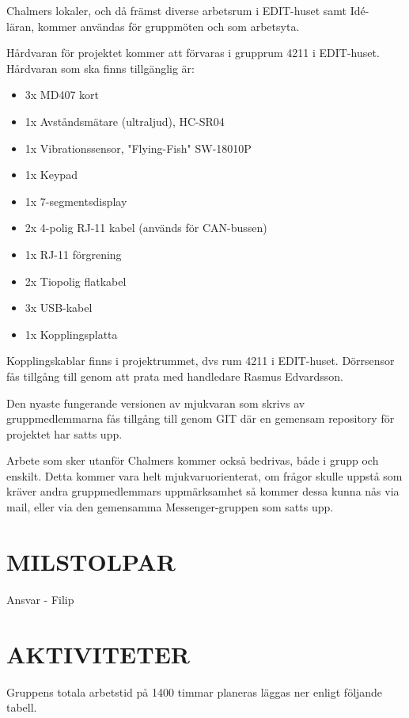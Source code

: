 \documentclass[a4paper]{article}
\begin{document}
Chalmers lokaler, och då främst diverse arbetsrum i EDIT-huset samt Idé-\\läran, kommer användas för gruppmöten och som arbetsyta.

Hårdvaran för projektet kommer att förvaras i grupprum 4211 i EDIT-huset. Hårdvaran som ska finns tillgänglig är:
\begin{itemize}
    \item 3x MD407 kort 
    \item 1x Avståndsmätare (ultraljud), HC-SR04 
    \item 1x Vibrationssensor, "Flying-Fish" SW-18010P 
    \item 1x Keypad 
    \item 1x 7-segmentsdisplay 
    \item 2x 4-polig RJ-11 kabel (används för CAN-bussen) 
    \item 1x RJ-11 förgrening
    \item 2x Tiopolig flatkabel 
    \item 3x USB-kabel 
    \item 1x Kopplingsplatta
\end{itemize}

Kopplingskablar finns i projektrummet, dvs rum 4211 i EDIT-huset. Dörrsensor fås tillgång till genom att prata med handledare Rasmus Edvardsson.

Den nyaste fungerande versionen av mjukvaran som skrivs av gruppmedlemmarna fås tillgång till genom GIT där en gemensam repository för projektet har satts upp.

Arbete som sker utanför Chalmers kommer också bedrivas, både i grupp och enskilt. Detta kommer vara helt mjukvaruorienterat, om frågor skulle uppstå som kräver andra gruppmedlemmars uppmärksamhet så kommer dessa kunna nås via mail, eller via den gemensamma Messenger-gruppen som satts upp.

\section{MILSTOLPAR}
\label{sec:milstolpar}

Ansvar - Filip

\section{AKTIVITETER}
\label{sec:sktiviteter}
Gruppens totala arbetstid på 1400 timmar planeras läggas ner enligt följande tabell.
\end{document}
